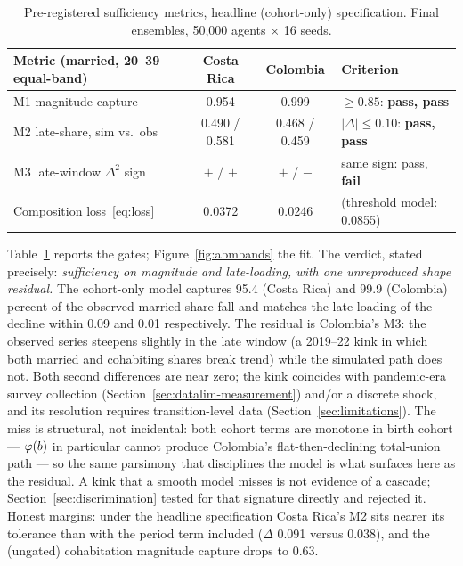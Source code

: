 \begin{table}[t]
\centering
\caption{Pre-registered sufficiency metrics, headline (cohort-only)
specification. Final ensembles, 50{,}000 agents $\times$ 16 seeds.}
\label{tab:gates}
\begin{tabular}{lccl}
\toprule
Metric (married, 20--39 equal-band) & Costa Rica & Colombia & Criterion \\
\midrule
M1 magnitude capture & 0.954 & 0.999 & $\geq 0.85$: \textbf{pass, pass} \\
M2 late-share, sim vs.\ obs & 0.490 / 0.581 & 0.468 / 0.459 & $|\Delta|\leq0.10$: \textbf{pass, pass} \\
M3 late-window $\Delta^2$ sign & $+$ / $+$ & $+$ / $-$ & same sign: pass, \textbf{fail} \\
\midrule
Composition loss~\eqref{eq:loss} & 0.0372 & 0.0246 &
  (threshold model: 0.0855) \\
\bottomrule
\end{tabular}
\end{table}

Table~\ref{tab:gates} reports the gates; Figure~\ref{fig:abmbands} the fit.
The verdict, stated precisely: \emph{sufficiency on magnitude and late-loading,
with one unreproduced shape residual.} The cohort-only model captures 95.4
(Costa Rica) and 99.9 (Colombia) percent of the observed married-share fall and
matches the late-loading of the decline within 0.09 and 0.01 respectively. The
residual is Colombia's M3: the observed series steepens slightly in the late
window (a 2019--22 kink in which both married and cohabiting shares break
trend) while the simulated path does not. Both second differences are near
zero; the kink coincides with pandemic-era survey collection
(Section~\ref{sec:datalim-measurement}) and/or a discrete shock, and its
resolution requires transition-level data
(Section~\ref{sec:limitations}). The miss is structural, not incidental: both
cohort terms are monotone in birth cohort --- $\varphi(b)$ in particular cannot
produce Colombia's flat-then-declining total-union path --- so the same
parsimony that disciplines the model is what surfaces here as the residual. A kink that a smooth model misses is not
evidence of a cascade; Section~\ref{sec:discrimination} tested for that
signature directly and rejected it. Honest margins: under the headline
specification Costa Rica's M2 sits nearer its tolerance than with the period
term included ($\Delta$ 0.091 versus 0.038), and the (ungated) cohabitation
magnitude capture drops to 0.63.

